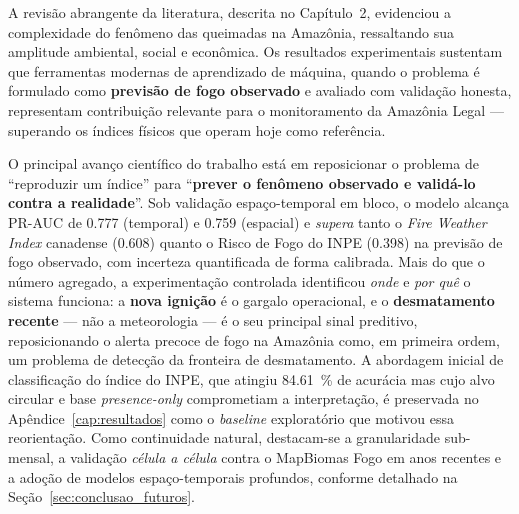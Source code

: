 \documentclass[tcc2]{uftex}
\makeatletter
\newcommand{\apendicesnosumario}{%
  \let\uftex@lchapter\l@chapter
  \def\l@chapter##1##2{{%
    \def\numberline####1{\MakeUppercase{\appendixname}~####1~--~}%
    \uftex@lchapter{##1}{##2}}}}
\makeatother
\begin{document}
A revisão abrangente da literatura, descrita no Capítulo~2, evidenciou a complexidade do fenômeno das queimadas na Amazônia, ressaltando sua amplitude ambiental, social e econômica. Os resultados experimentais sustentam que ferramentas modernas de aprendizado de máquina, quando o problema é formulado como \textbf{previsão de fogo observado} e avaliado com validação honesta, representam contribuição relevante para o monitoramento da Amazônia Legal --- superando os índices físicos que operam hoje como referência.

O principal avanço científico do trabalho está em reposicionar o problema de ``reproduzir um índice'' para ``\textbf{prever o fenômeno observado e validá-lo contra a realidade}''. Sob validação espaço-temporal em bloco, o modelo alcança PR-AUC de \num{0,777} (temporal) e \num{0,759} (espacial) e \emph{supera} tanto o \emph{Fire Weather Index} canadense (\num{0,608}) quanto o Risco de Fogo do INPE (\num{0,398}) na previsão de fogo observado, com incerteza quantificada de forma calibrada. Mais do que o número agregado, a experimentação controlada identificou \emph{onde} e \emph{por quê} o sistema funciona: a \textbf{nova ignição} é o gargalo operacional, e o \textbf{desmatamento recente} --- não a meteorologia --- é o seu principal sinal preditivo, reposicionando o alerta precoce de fogo na Amazônia como, em primeira ordem, um problema de detecção da fronteira de desmatamento. A abordagem inicial de classificação do índice do INPE, que atingiu \SI{84,61}{\percent} de acurácia mas cujo alvo circular e base \emph{presence-only} comprometiam a interpretação, é preservada no Apêndice~\ref{cap:resultados} como o \emph{baseline} exploratório que motivou essa reorientação. Como continuidade natural, destacam-se a granularidade sub-mensal, a validação \emph{célula a célula} contra o MapBiomas Fogo em anos recentes e a adoção de modelos espaço-temporais profundos, conforme detalhado na Seção~\ref{sec:conclusao_futuros}.


\backmatter
\singlespacing


\appendix
\onehalfspacing

\makeatletter
\def\@makechapterhead#1{%
  \vspace*{0pt}\par
  {\centering\normalfont\bfseries
   \MakeUppercase{\appendixname}~\thechapter~--~\MakeUppercase{#1}\par}%
  \vspace{45pt}\par}
\makeatother
\addtocontents{toc}{\protect\apendicesnosumario}
\end{document}
